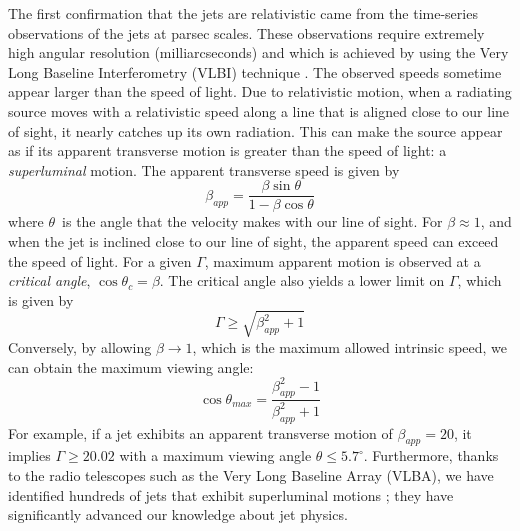 The first confirmation that the jets are relativistic came from the time-series observations of the jets at parsec scales. These observations require extremely high angular resolution (milliarcseconds) and which is achieved by using the Very Long Baseline Interferometry (VLBI) technique \citep{cohen1971small}. The observed speeds sometime appear larger than the speed of light. Due to relativistic motion, when a radiating source moves with a relativistic speed along a line that is aligned close to our line of sight, it nearly catches up its own radiation. This can make the source appear as if its apparent transverse motion is greater than the speed of light: a \textit{superluminal} motion. The apparent transverse speed is given by
\begin{equation}
    \beta_{app}=\frac{\beta\sin{\theta}}{1-\beta\cos{\theta}}
\end{equation}
where $\theta$~is the angle that the velocity makes with our line of sight.
For $\beta\approx1$, and when the jet is inclined close to our line of sight, the apparent speed can exceed the speed of light. For a given $\Gamma$, maximum apparent motion is observed at a \textit{critical angle}, $\cos{\theta_c}=\beta$. The critical angle also yields a lower limit on $\Gamma$, which is given by
\begin{equation}
    \Gamma\geq\sqrt{\beta_{app}^2+1}
\end{equation}
Conversely, by allowing $\beta\to1$, which is the maximum allowed intrinsic speed, we can obtain the maximum viewing angle:
\begin{equation}
    \cos{\theta_{max}}=\frac{\beta_{app}^2-1}{\beta_{app}^2+1}
\end{equation}
For example, if a jet exhibits an apparent transverse motion of $\beta_{app}=20$, it implies $\Gamma\geq20.02$ with a maximum viewing angle $\theta\leq5.7^\circ$.
Furthermore, thanks to the radio telescopes such as the Very Long Baseline Array (VLBA), we have identified hundreds of jets that exhibit superluminal motions \citep[e.g.,][]{2018ApJS..234...12L}; they have significantly advanced our knowledge about jet physics.

